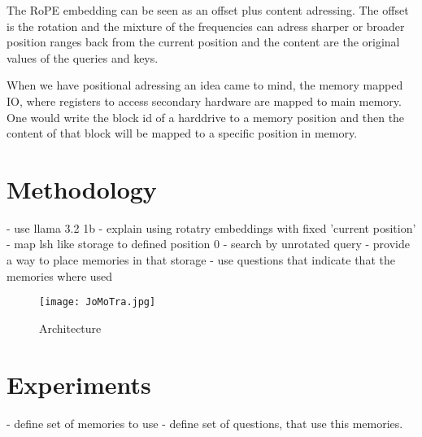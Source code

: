 \documentclass[11pt]{article}
\begin{document}
The RoPE embedding can be seen as an offset plus content adressing. The offset is the rotation and the mixture of the frequencies can adress sharper or broader position ranges
back from the current position and the content are the original values of the queries and keys. 


When we have positional adressing an idea came to mind, the memory mapped IO, where registers to access secondary hardware are mapped to main memory. One would write the block
id of a harddrive to a memory position and then the content of that block will be mapped to a specific position in memory.






\section{Methodology}

- use llama 3.2 1b
- explain using rotatry embeddings with fixed 'current position'
- map lsh like storage to defined position 0
- search by unrotated query
- provide a way to place memories in that storage
- use questions that indicate that the memories where used 

\begin{figure}[h]
\centering
\texttt{[image: JoMoTra.jpg]}
\caption{Architecture}
\label{fig:Architecture}
\end{figure}


\section{Experiments}

- define set of memories to use
- define set of questions, that use this memories.

\end{document}
